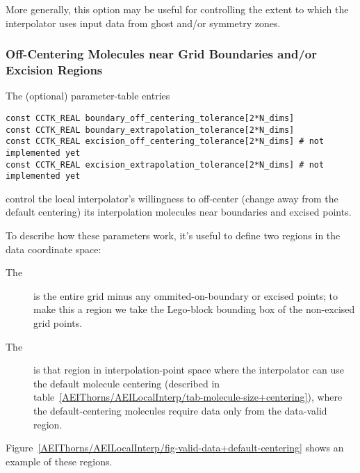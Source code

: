 More generally, this option may be useful for controlling the extent
to which the interpolator uses input data from ghost and/or symmetry
zones.


\subsubsection{Off-Centering Molecules near Grid Boundaries
	       and/or Excision Regions}

The (optional) parameter-table entries
\begin{verbatim}
const CCTK_REAL boundary_off_centering_tolerance[2*N_dims]
const CCTK_REAL boundary_extrapolation_tolerance[2*N_dims]
const CCTK_REAL excision_off_centering_tolerance[2*N_dims] # not implemented yet
const CCTK_REAL excision_extrapolation_tolerance[2*N_dims] # not implemented yet
\end{verbatim}
control the local interpolator's willingness to off-center
(change away from the default centering) its interpolation molecules
near boundaries and excised points.

To describe how these parameters work, it's useful to define two
regions in the data coordinate space:
\begin{description}
\item[The ]
	is the entire grid minus any ommited-on-boundary
	or excised points; to make this a region we take the
	Lego-block bounding box of the non-excised grid points.
\item[The ]
	is that region in interpolation-point space where the
	interpolator can use the default molecule centering
	(described in table~\ref{AEIThorns/AEILocalInterp/tab-molecule-size+centering}),
	\ie{} where the default-centering molecules require data
	only from the data-valid region.
\end{description}
Figure~\ref{AEIThorns/AEILocalInterp/fig-valid-data+default-centering} shows an
example of these regions.


